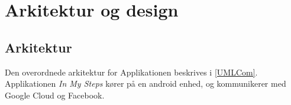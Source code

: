 \thispagestyle{fancy}
\chapter{Arkitektur og design}
\label{chp:description}

\section{Arkitektur}
Den overordnede arkitektur for Applikationen beskrives i \ref{UMLCom}. Applikationen \emph{In My Steps} kører på en android enhed, og kommunikerer med Google Cloud og Facebook.


